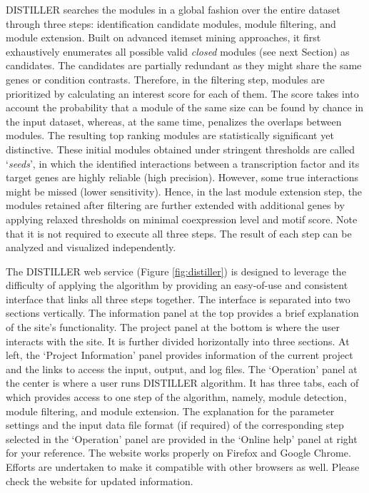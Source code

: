 DISTILLER searches the modules in a global fashion over the entire dataset
through three steps: identification candidate modules, module filtering, and
module extension.
%
Built on advanced itemset mining approaches, it first exhaustively enumerates
all possible valid \textit{closed} modules (see next Section) as candidates. The
candidates are partially redundant as they might share the same genes or
condition contrasts.
%
Therefore, in the filtering step, modules are prioritized by calculating an
interest score for each of them.  The score takes into account the probability
that a module of the same size can be found by chance in the input dataset,
whereas, at the same time, penalizes the overlaps between modules.
%
The resulting top ranking modules are statistically significant yet distinctive.
These initial modules obtained under stringent thresholds are called
`\textit{seeds}', in which the identified interactions between a transcription
factor and its target genes are highly reliable (high precision).  However, some
true interactions might be missed (lower sensitivity).
%
Hence, in the last module extension step, the modules retained after filtering
are further extended with additional genes by applying relaxed thresholds on
minimal coexpression level and motif score.
%
Note that it is not required to execute all three steps.  The result of each
step can be analyzed and visualized independently.

The DISTILLER web service \cite{DISTILLER} (Figure \ref{fig:distiller}) is 
designed to leverage the difficulty of applying the algorithm by providing an 
easy-of-use and consistent interface that links all three steps together. 
%
The interface is separated into two sections vertically. The information panel
at the top provides a brief explanation of the site's functionality. The project
panel at the bottom is where the user interacts with the site.
%
It is further divided horizontally into three sections.  At left, the `Project
Information' panel provides information of the current project and the links to
access the input, output, and log files.
%
The `Operation' panel at the center is where a user runs DISTILLER algorithm.
It has three tabs, each of which provides access to one step of the algorithm,
namely, module detection, module filtering, and module extension.
%
The explanation for the parameter settings and the input data file format (if
required) of the corresponding step selected in the `Operation' panel are
provided in the `Online help' panel at right for your reference.  
%
The website works properly on Firefox and Google Chrome.  Efforts are undertaken
to make it compatible with other browsers as well.  Please check the website for
updated information. %

